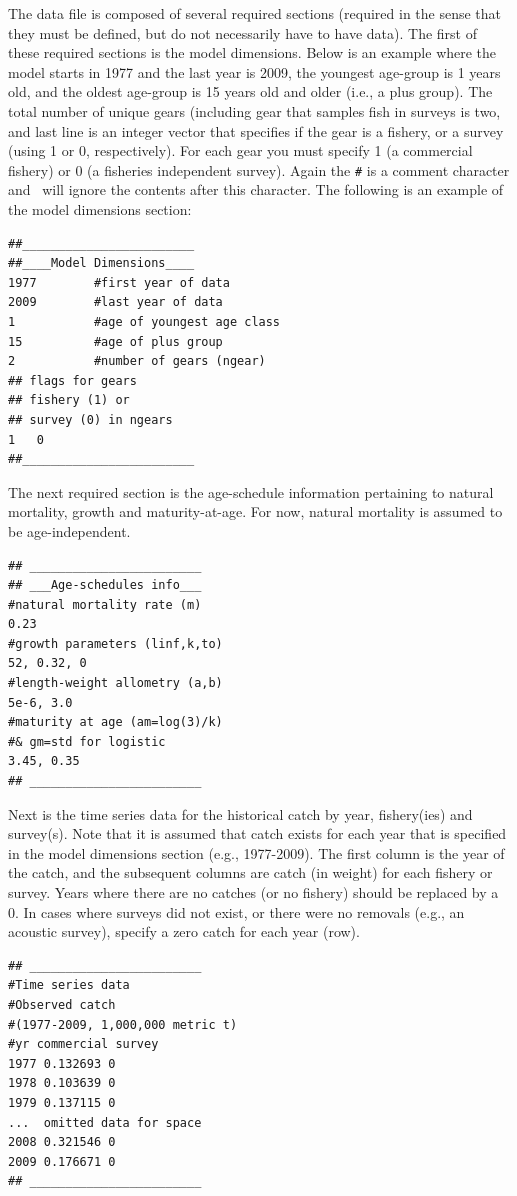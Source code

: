\begin{multicols}{2}
The data file is composed of several required sections (required in the sense that they must be defined, but do not necessarily have to have data).  The first of these required sections is the model dimensions.  Below is an example where the model starts in 1977 and the last year is 2009, the youngest age-group is 1 years old, and the oldest age-group is 15 years old and older (i.e., a plus group).  The total number of unique gears (including gear that samples fish in surveys is two, and last line is an integer vector that specifies if the gear is a fishery, or a survey (using 1 or 0, respectively).  For each gear you must specify 1 (a commercial fishery) or 0 (a fisheries independent survey).  Again the \verb"#" is a comment character and \iscam\ will ignore the contents after this character.  The following is an example of the model dimensions section:
\begin{verbatim}
##________________________
##____Model Dimensions____
1977		#first year of data
2009		#last year of data
1			#age of youngest age class
15			#age of plus group
2			#number of gears (ngear)
## flags for gears 
## fishery (1) or 
## survey (0) in ngears
1	0
##________________________
\end{verbatim}

The next required section is the age-schedule information pertaining to natural mortality, growth and maturity-at-age. For now, natural mortality is assumed to be age-independent.
\begin{verbatim}
## ________________________
## ___Age-schedules info___
#natural mortality rate (m)
0.23
#growth parameters (linf,k,to)
52, 0.32, 0
#length-weight allometry (a,b)
5e-6, 3.0
#maturity at age (am=log(3)/k) 
#& gm=std for logistic
3.45, 0.35
## ________________________
\end{verbatim}

Next is the time series data for the historical catch by year, fishery(ies) and survey(s).  Note that it is assumed that catch exists for each year that is specified in the model dimensions section (e.g., 1977-2009).  The first column is the year of the catch, and the subsequent columns are catch (in weight) for each fishery or survey.  Years where there are no catches (or no fishery) should be replaced by a 0.  In cases where surveys did not exist, or there were no removals (e.g., an acoustic survey), specify a zero catch for each year (row).  
\begin{verbatim}
## ________________________
#Time series data
#Observed catch 
#(1977-2009, 1,000,000 metric t)
#yr	commercial survey
1977 0.132693 0
1978 0.103639 0
1979 0.137115 0
...  omitted data for space
2008 0.321546 0
2009 0.176671 0
## ________________________
\end{verbatim}


\end{multicols}
